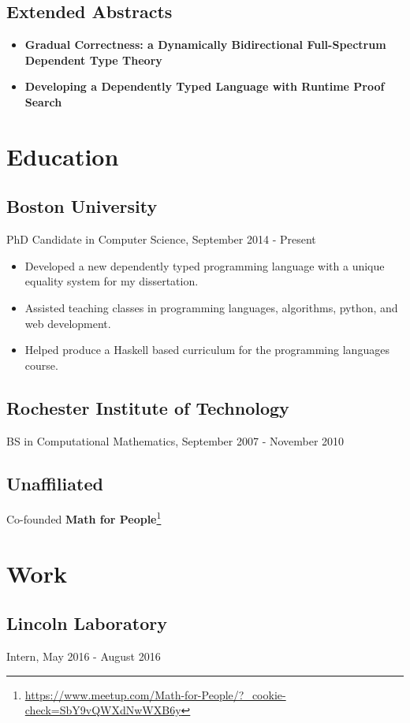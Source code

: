 \subsection*{Extended Abstracts}
\begin{itemize}
  \item \textbf{Gradual Correctness: a Dynamically Bidirectional Full-Spectrum Dependent Type Theory}\cite{gradualcorrectnessea}
  \item \textbf{Developing a Dependently Typed Language with Runtime Proof Search}\cite{extendedabstract}
\end{itemize}


\section*{Education}
\subsection*{Boston University}
PhD Candidate in Computer Science, September 2014 - Present
\begin{itemize}
  \item Developed a new dependently typed programming language with a unique equality system for my dissertation.
  \item Assisted teaching classes in programming languages, algorithms, python, and web development.
  \item Helped produce a Haskell based curriculum for the programming languages course.
\end{itemize}

\subsection*{Rochester Institute of Technology}
BS in Computational Mathematics, September 2007 - November 2010

\subsection*{Unaffiliated}
Co-founded \textbf{Math for People}\footnote{\url{https://www.meetup.com/Math-for-People/?_cookie-check=SbY9vQWXdNwWXB6y}}

\section*{Work}
\subsection*{Lincoln Laboratory}
Intern,	May 2016 - August 2016

